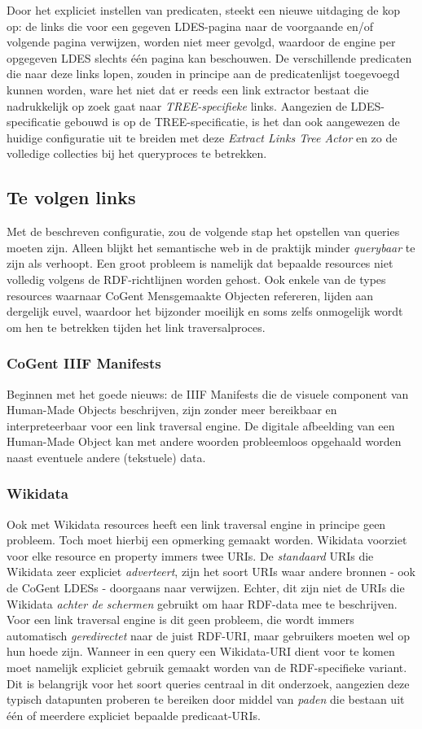 \documentclass[conference]{IEEEtran}
\begin{document}
Door het expliciet instellen van predicaten, steekt een nieuwe uitdaging de kop op: de links die voor een gegeven LDES-pagina naar de voorgaande en/of volgende pagina verwijzen, worden niet meer gevolgd, waardoor de engine per opgegeven LDES slechts één pagina kan beschouwen. De verschillende predicaten die naar deze links lopen, zouden in principe aan de predicatenlijst toegevoegd kunnen worden, ware het niet dat er reeds een link extractor bestaat die nadrukkelijk op zoek gaat naar \textit{TREE-specifieke} links. Aangezien de LDES-specificatie gebouwd is op de TREE-specificatie, is het dan ook aangewezen de huidige configuratie uit te breiden met deze \textit{Extract Links Tree Actor} en zo de volledige collecties bij het queryproces te betrekken. \cite{colpaert2023tree}

\subsection{Te volgen links}
Met de beschreven configuratie, zou de volgende stap het opstellen van queries moeten zijn. Alleen blijkt het semantische web in de praktijk minder \textit{querybaar} te zijn als verhoopt. Een groot probleem is namelijk dat bepaalde resources niet volledig volgens de RDF-richtlijnen worden gehost. Ook enkele van de types resources waarnaar CoGent Mensgemaakte Objecten refereren, lijden aan dergelijk euvel, waardoor het bijzonder moeilijk en soms zelfs onmogelijk wordt om hen te betrekken tijden het link traversalproces.

\subsubsection{CoGent IIIF Manifests}
Beginnen met het goede nieuws: de IIIF Manifests die de visuele component van Human-Made Objects beschrijven, zijn zonder meer bereikbaar en interpreteerbaar voor een link traversal engine. De digitale afbeelding van een Human-Made Object kan met andere woorden probleemloos opgehaald worden naast eventuele andere (tekstuele) data.

\subsubsection{Wikidata}
Ook met Wikidata resources heeft een link traversal engine in principe geen probleem. Toch moet hierbij een opmerking gemaakt worden. Wikidata voorziet voor elke resource en property immers twee URIs. De \textit{standaard} URIs die Wikidata zeer expliciet \textit{adverteert}, zijn het soort URIs waar andere bronnen - ook de CoGent LDESs - doorgaans naar verwijzen. Echter, dit zijn niet de URIs die Wikidata \textit{achter de schermen} gebruikt om haar RDF-data mee te beschrijven. Voor een link traversal engine is dit geen probleem, die wordt immers automatisch \textit{geredirectet} naar de juist RDF-URI, maar gebruikers moeten wel op hun hoede zijn. Wanneer in een query een Wikidata-URI dient voor te komen moet namelijk expliciet gebruik gemaakt worden van de RDF-specifieke variant. Dit is belangrijk voor het soort queries centraal in dit onderzoek, aangezien deze typisch datapunten proberen te bereiken door middel van \textit{paden} die bestaan uit één of meerdere expliciet bepaalde predicaat-URIs.
\end{document}
